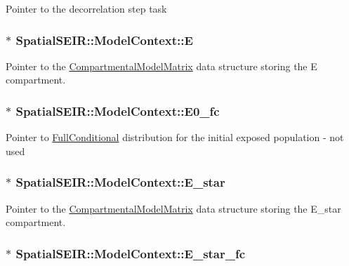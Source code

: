 Pointer to the decorrelation step task \hypertarget{classSpatialSEIR_1_1ModelContext_ad5128cd85f8a1005b11a97c6ff7894e1}{
\subsubsection[{E}]{$\ast$ Spatial\-S\-E\-I\-R\-::\-Model\-Context\-::\-E}}\label{classSpatialSEIR_1_1ModelContext_ad5128cd85f8a1005b11a97c6ff7894e1}
Pointer to the \hyperlink{classSpatialSEIR_1_1CompartmentalModelMatrix}{Compartmental\-Model\-Matrix} data structure storing the E compartment. \hypertarget{classSpatialSEIR_1_1ModelContext_a677ffe9133f332b346d7b1652d95552f}{
\subsubsection[{E0\-\_\-fc}]{$\ast$ Spatial\-S\-E\-I\-R\-::\-Model\-Context\-::\-E0\-\_\-fc}}\label{classSpatialSEIR_1_1ModelContext_a677ffe9133f332b346d7b1652d95552f}
Pointer to \hyperlink{classSpatialSEIR_1_1FullConditional}{Full\-Conditional} distribution for the initial exposed population -\/ not used \hypertarget{classSpatialSEIR_1_1ModelContext_a92a044fd49fd0d4996dd38a38f3f14a9}{
\subsubsection[{E\-\_\-star}]{$\ast$ Spatial\-S\-E\-I\-R\-::\-Model\-Context\-::\-E\-\_\-star}}\label{classSpatialSEIR_1_1ModelContext_a92a044fd49fd0d4996dd38a38f3f14a9}
Pointer to the \hyperlink{classSpatialSEIR_1_1CompartmentalModelMatrix}{Compartmental\-Model\-Matrix} data structure storing the E\-\_\-star compartment. \hypertarget{classSpatialSEIR_1_1ModelContext_ab2ceb1ec8e001f4d4f63eddfc0c44021}{
\subsubsection[{E\-\_\-star\-\_\-fc}]{$\ast$ Spatial\-S\-E\-I\-R\-::\-Model\-Context\-::\-E\-\_\-star\-\_\-fc}}\label{classSpatialSEIR_1_1ModelContext_ab2ceb1ec8e001f4d4f63eddfc0c44021}
